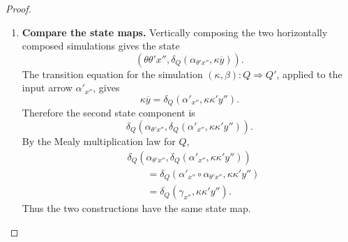 \begin{proof}
\begin{enumerate}
        Similarly, horizontally composing
        \[
            (\theta',\alpha'):P'\Rightarrow P''
        \]
        with
        \[
            (\kappa',\beta'):Q'\Rightarrow Q''
        \]
        gives a simulation
        \[
            Q'\circ P'\Rightarrow Q''\circ P''
        \]
        whose state map is
        \[
            (x'',y'')
            \longmapsto
            \left(
                \theta'x'',
                \delta_{Q'}(\alpha'_{x''},\kappa'y'')
            \right)
        \]
        and whose comparison component is
        \[
            \beta'_{y''}\circ
            \omega_{Q'}(\alpha'_{x''},\kappa'y'').
        \]

        Put
        \[
            \overline y
            :=
            \delta_{Q'}(\alpha'_{x''},\kappa'y'').
        \]

        \item \textbf{Compare the state maps.}
        Vertically composing the two horizontally composed simulations gives
        the state
        \[
            \left(
                \theta\theta'x'',
                \delta_Q(
                    \alpha_{\theta'x''},
                    \kappa\overline y
                )
            \right).
        \]
        The transition equation for the simulation
        \((\kappa,\beta):Q\Rightarrow Q'\), applied to the input arrow
        \(\alpha'_{x''}\), gives
        \[
            \kappa\overline y
            =
            \delta_Q(
                \alpha'_{x''},
                \kappa\kappa'y''
            ).
        \]
        Therefore the second state component is
        \[
            \delta_Q\!\left(
                \alpha_{\theta'x''},
                \delta_Q(
                    \alpha'_{x''},
                    \kappa\kappa'y''
                )
            \right).
        \]
        By the Mealy multiplication law for \(Q\),
        \[
        \begin{aligned}
            &
            \delta_Q\!\left(
                \alpha_{\theta'x''},
                \delta_Q(
                    \alpha'_{x''},
                    \kappa\kappa'y''
                )
            \right)
            \\
            &\qquad=
            \delta_Q\!\left(
                \alpha'_{x''}\circ\alpha_{\theta'x''},
                \kappa\kappa'y''
            \right)
            \\
            &\qquad=
            \delta_Q(
                \gamma_{x''},
                \kappa\kappa'y''
            ).
        \end{aligned}
        \]
        Thus the two constructions have the same state map.


\end{enumerate}
\end{proof}
